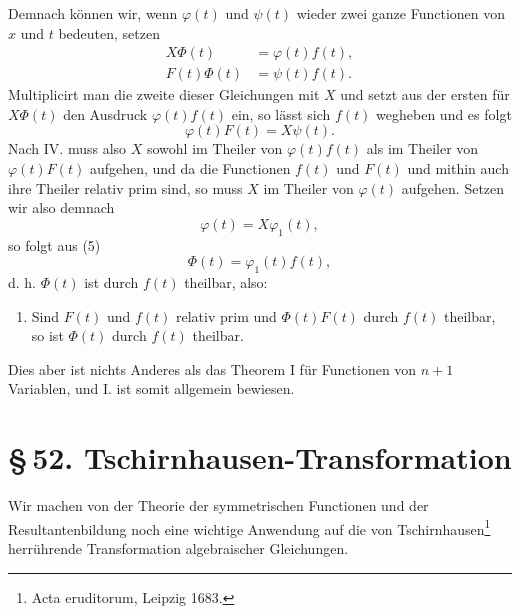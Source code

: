 \documentclass[11pt]{article}
\providecommand{\sect}[2]{\section*{\S\,#1. #2}}
\begin{document}
Demnach können wir, wenn $\varphi(t)$ und $\psi(t)$ wieder zwei ganze Functionen von $x$ und $t$ bedeuten, setzen
\begin{equation}
\begin{aligned}
X\Phi(t)&=\varphi(t)f(t),\\
F(t)\Phi(t)&=\psi(t)f(t).
\end{aligned}
\tag{5}
\end{equation}
Multiplicirt man die zweite dieser Gleichungen mit $X$ und setzt aus der ersten für $X\Phi(t)$ den Ausdruck $\varphi(t)f(t)$ ein, so lässt sich $f(t)$ wegheben und es folgt
\[
\varphi(t)F(t)=X\psi(t).
\]
Nach IV. muss also $X$ sowohl im Theiler von $\varphi(t)f(t)$ als im Theiler von $\varphi(t)F(t)$ aufgehen, und da die Functionen $f(t)$ und $F(t)$ und mithin auch ihre Theiler relativ prim sind, so muss $X$ im Theiler von $\varphi(t)$ aufgehen. Setzen wir also demnach
\[
\varphi(t)=X\varphi_1(t),
\]
so folgt aus (5)
\[
\Phi(t)=\varphi_1(t)f(t),
\]
d. h. $\Phi(t)$ ist durch $f(t)$ theilbar, also:

\begin{enumerate}[label=\Roman*.,leftmargin=2.4em,start=7]
\item Sind $F(t)$ und $f(t)$ relativ prim und $\Phi(t)F(t)$ durch $f(t)$ theilbar, so ist $\Phi(t)$ durch $f(t)$ theilbar.
\end{enumerate}

Dies aber ist nichts Anderes als das Theorem I für Functionen von $n+1$ Variablen, und I. ist somit allgemein bewiesen.

\sect{52}{Tschirnhausen-Transformation}

Wir machen von der Theorie der symmetrischen Functionen und der Resultantenbildung noch eine wichtige Anwendung auf die von Tschirnhausen\footnote{Acta eruditorum, Leipzig 1683.} herrührende Transformation algebraischer Gleichungen.
\end{document}
